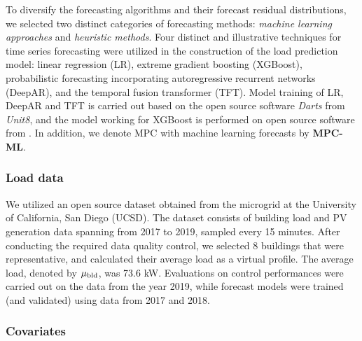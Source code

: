 
To diversify the forecasting algorithms and their forecast residual distributions, we selected two distinct categories of forecasting methods: \textit{machine learning approaches} and \textit{heuristic methods}.
Four distinct and illustrative techniques for time series forecasting were utilized in the construction of the load prediction model: linear regression (LR), extreme gradient boosting (XGBoost), probabilistic forecasting incorporating autoregressive recurrent networks (DeepAR), and the temporal fusion transformer (TFT). Model training of LR, DeepAR and TFT is carried out based on the open source software \emph{Darts} from \emph{Unit8}\cite{Darts}, and the model working for XGBoost is performed on open source software from \cite{XGBoost}. In addition, we denote MPC with machine learning forecasts by \textbf{MPC-ML}.

\subsubsection{Load data} %

We utilized an open source dataset obtained from the microgrid at the University of California, San Diego (UCSD)\cite{silwal_open-source_2021}. The dataset consists of building load and PV generation data spanning from 2017 to 2019, sampled every 15 minutes. After conducting the required data quality control, we selected 8 buildings that were representative, and calculated their average load as a virtual profile. The average load, denoted by $\mu_\text{bld}$, was 73.6 kW. Evaluations on control performances were carried out on the data from the year 2019, while forecast models were trained (and validated) using data from 2017 and 2018.

\subsubsection{Covariates} %

